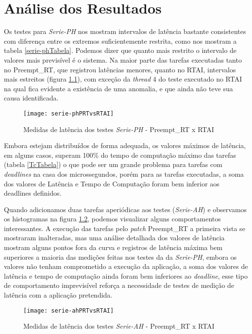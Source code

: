 \chapter{Análise dos Resultados}
\label{cap:resultados}
Os testes para \textit{Serie-PH} nos mostram intervalos de latência bastante consistentes com diferença entre os extremos suficientemente restrita, como nos mostram a tabela \ref{serie-phTabela}. Podemos dizer que quanto mais restrito o intervalo de valores mais previsível é o sistema. Na maior parte das tarefas executadas tanto no Preempt\_RT, que registrou latências menores, quanto no RTAI, intervalos mais estreitos (figura \ref{serie-phPRTvsRTAI}), com exceção da \textit{thread} 4 do teste executado no RTAI na qual fica evidente a existência de uma anomalia, e que ainda não teve sua causa identificada.

\begin{figure}[!h]
    \centering
    \texttt{[image: serie-phPRTvsRTAI]}
    \caption{Medidas de latência dos testes \textit{Serie-PH} - Preempt\_RT x RTAI}
    \label{serie-phPRTvsRTAI}
\end{figure}

Embora estejam distribuídos de forma  adequada, os valores máximos de latência, em alguns casos, superam 100\% do tempo de computação máximo das tarefas (tabela \ref{TcTabela}) o que pode ser um grande problema para tarefas com \textit{deadlines} na casa dos microssegundos, porém para as tarefas executadas, a soma dos valores de Latência e Tempo de Computação foram bem inferior aos deadlines definidos.

Quando adicionamos duas tarefas aperiódicas aos testes (\textit{Serie-AH}) e observamos os histogramas na figura \ref{serie-ahPRTvsRTAI}, podemos visualizar alguns comportamentos interessantes. A execução das tarefas pelo \textit{patch} Preempt\_RT a primeira vista se mostraram inalteradas, mas uma análise detalhada dos valores de latência mostram alguns pontos fora da curva e registros de latência máxima bem superiores a maioria das medições feitas nos testes da da \textit{Serie-PH}, embora os valores não tenham comprometido a execução da aplicação, a soma dos valores de latência e tempo de computação ainda foram bem inferiores ao \textit{deadline}, esse tipo de comportamento imprevisível reforça a necessidade de testes de medição de latência com a aplicação pretendida. 

\begin{figure}[!h]
    \centering
    \texttt{[image: serie-ahPRTvsRTAI]}
    \caption{Medidas de latência dos testes \textit{Serie-AH} - Preempt\_RT x RTAI}
    \label{serie-ahPRTvsRTAI}
\end{figure}

